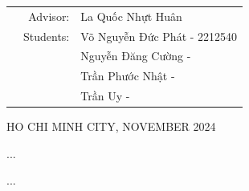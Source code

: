 \documentclass[a4paper]{article}
\begin{document}
\begin{spacing}{1.3}
\begin{titlepage}
        \vspace{3cm}

        \begin{table}[h]
            \begin{tabular}{rrl}
                \hspace{5 cm} & Advisor:  & La Quốc Nhựt Huân                                    \\
                              & Students: & Võ Nguyễn Đức Phát - 2212540 \\
                              &           & Nguyễn Đăng Cường -  \\
                              &           & Trần Phước Nhật -  \\
                              &           & Trần Uy -  \\

            \end{tabular}
        \end{table}

        \begin{center}
            {\footnotesize HO CHI MINH CITY, NOVEMBER 2024}
        \end{center}
    \end{titlepage}



    \newpage
    \tableofcontents
    \newpage


    
    
    
    

    

    \begin{thebibliography}{80}


        ...


        ...

    \end{thebibliography}

\end{spacing}
\end{document}
